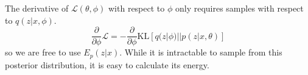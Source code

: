 \documentclass{article} %
\def\KL{\text{KL}}
\begin{document}
The derivative of $\mathcal{L}(\theta, \phi)$ with respect to $\phi$ only requires samples with respect to $q(z|x,\phi)$.  
\begin{equation*}
\frac{\partial}{\partial \phi} \mathcal{L} = -\frac{\partial}{\partial \phi} \KL[q(z|\phi)||p(z|x,\theta)]
\end{equation*}
so we are free to use $E_p(z|x)$.  While it is intractable to sample from this posterior distribution, it is easy to calculate its energy.
\end{document}
